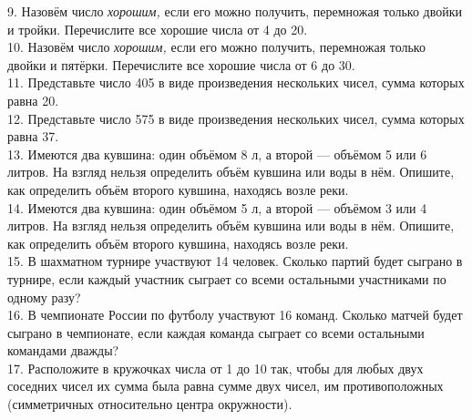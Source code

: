 \documentclass[12pt]{article}
\begin{document}
\begin{center}
\begin{figure}[h!]
\end{figure}
\end{center}
9. Назовём число {\it хорошим,} если его можно получить, перемножая только двойки и тройки. Перечислите все хорошие числа от 4 до 20.\\
10. Назовём число {\it хорошим,} если его можно получить, перемножая только двойки и пятёрки. Перечислите все хорошие числа от 6 до 30.\\
11. Представьте число 405 в виде произведения нескольких чисел, сумма которых равна 20.\\
12. Представьте число 575 в виде произведения нескольких чисел, сумма которых равна 37.\\
13. Имеются два кувшина: один объёмом 8 л, а второй --- объёмом 5 или 6 литров. На взгляд нельзя определить объём кувшина или воды в нём. Опишите, как определить объём второго кувшина, находясь возле реки.\\
14. Имеются два кувшина: один объёмом 5 л, а второй --- объёмом 3 или 4 литров. На взгляд нельзя определить объём кувшина или воды в нём. Опишите, как определить объём второго кувшина, находясь возле реки.\\
15. В шахматном турнире участвуют 14 человек. Сколько партий будет сыграно в турнире, если каждый участник сыграет со всеми остальными участниками по одному разу?\\
16. В чемпионате России по футболу участвуют 16 команд. Сколько матчей будет сыграно в чемпионате, если каждая команда сыграет со всеми остальными командами дважды?\\
17. Расположите в кружочках числа от 1 до 10 так, чтобы для любых двух соседних чисел их сумма была равна сумме двух чисел, им противоположных (симметричных относительно центра окружности).
\end{document}
